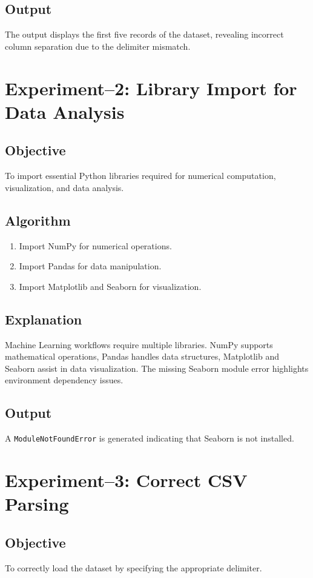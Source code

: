 \documentclass[11pt]{article}
\begin{document}
\subsection*{Output}
The output displays the first five records of the dataset, revealing incorrect column separation due to the delimiter mismatch.

\section{Experiment--2: Library Import for Data Analysis}

\subsection*{Objective}
To import essential Python libraries required for numerical computation, visualization, and data analysis.

\subsection*{Algorithm}
\begin{enumerate}
    \item Import NumPy for numerical operations.
    \item Import Pandas for data manipulation.
    \item Import Matplotlib and Seaborn for visualization.
\end{enumerate}

\subsection*{Explanation}
Machine Learning workflows require multiple libraries. NumPy supports mathematical operations, Pandas handles data structures, Matplotlib and Seaborn assist in data visualization. The missing Seaborn module error highlights environment dependency issues.

\subsection*{Output}
A \texttt{ModuleNotFoundError} is generated indicating that Seaborn is not installed.

\section{Experiment--3: Correct CSV Parsing}

\subsection*{Objective}
To correctly load the dataset by specifying the appropriate delimiter.
\end{document}
